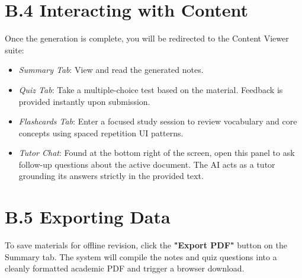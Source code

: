 \section*{B.4 Interacting with Content}
Once the generation is complete, you will be redirected to the Content Viewer suite:
\begin{itemize}
    \item \textit{Summary Tab}: View and read the generated notes.
    \item \textit{Quiz Tab}: Take a multiple-choice test based on the material. Feedback is provided instantly upon submission.
    \item \textit{Flashcards Tab}: Enter a focused study session to review vocabulary and core concepts using spaced repetition UI patterns.
    \item \textit{Tutor Chat}: Found at the bottom right of the screen, open this panel to ask follow-up questions about the active document. The AI acts as a tutor grounding its answers strictly in the provided text.
\end{itemize}

\section*{B.5 Exporting Data}
To save materials for offline revision, click the \textbf{"Export PDF"} button on the Summary tab. The system will compile the notes and quiz questions into a cleanly formatted academic PDF and trigger a browser download.
